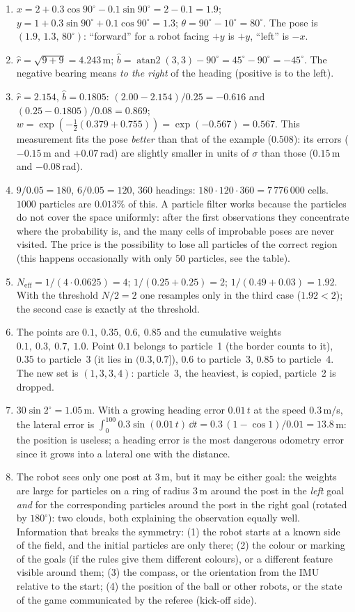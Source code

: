 \begin{enumerate}[label=\textbf{\ansnum.\arabic*}]
  \item $x=2+0.3\cos90^{\circ}-0.1\sin90^{\circ}=2-0.1=1.9$; $y=1+0.3\sin90^{\circ}+0.1\cos90^{\circ}=1.3$; $\theta=90^{\circ}-10^{\circ}=80^{\circ}$. The pose is $(1.9,\,1.3,\,80^{\circ})$: ``forward'' for a robot facing $+y$ is $+y$, ``left'' is $-x$.
  \item $\hat r=\sqrt{9+9}=4.243$\,m; $\hat b=\operatorname{atan2}(3,3)-90^{\circ}=45^{\circ}-90^{\circ}=-45^{\circ}$. The negative bearing means \emph{to the right} of the heading (positive is to the left).
  \item $\hat r=2.154$, $\hat b=0.1805$: $(2.00-2.154)/0.25=-0.616$ and $(0.25-0.1805)/0.08=0.869$; $w=\exp(-\tfrac12(0.379+0.755))=\exp(-0.567)=0.567$. This measurement fits the pose \emph{better} than that of the example ($0.508$): its errors ($-0.15$\,m and $+0.07$\,rad) are slightly smaller in units of $\sigma$ than those ($0.15$\,m and $-0.08$\,rad).
  \item $9/0.05=180$, $6/0.05=120$, $360$ headings: $180\cdot120\cdot360=7\,776\,000$ cells. $1000$ particles are $0.013\%$ of this. A particle filter works because the particles do not cover the space uniformly: after the first observations they concentrate where the probability is, and the many cells of improbable poses are never visited. The price is the possibility to lose all particles of the correct region (this happens occasionally with only $50$ particles, see the table).
  \item $N_{\text{eff}}=1/(4\cdot0.0625)=4$; $1/(0.25+0.25)=2$; $1/(0.49+0.03)=1.92$. With the threshold $N/2=2$ one resamples only in the third case ($1.92<2$); the second case is exactly at the threshold.
  \item The points are $0.1,\ 0.35,\ 0.6,\ 0.85$ and the cumulative weights $0.1,\ 0.3,\ 0.7,\ 1.0$. Point $0.1$ belongs to particle~1 (the border counts to it), $0.35$ to particle~3 (it lies in $(0.3,0.7]$), $0.6$ to particle~3, $0.85$ to particle~4. The new set is $(1,3,3,4)$: particle~3, the heaviest, is copied, particle~2 is dropped.
  \item $30\sin2^{\circ}=1.05$\,m. With a growing heading error $0.01\,t$ at the speed $0.3$\,m/s, the lateral error is $\int_0^{100}0.3\sin(0.01\,t)\,\dd t=0.3\,(1-\cos1)/0.01=13.8$\,m: the position is useless; a heading error is the most dangerous odometry error since it grows into a lateral one with the distance.
  \item The robot sees only one post at $3$\,m, but it may be either goal: the weights are large for particles on a ring of radius $3$\,m around the post in the \emph{left} goal \emph{and} for the corresponding particles around the post in the right goal (rotated by $180^{\circ}$): two clouds, both explaining the observation equally well. Information that breaks the symmetry: (1) the robot starts at a known side of the field, and the initial particles are only there; (2) the colour or marking of the goals (if the rules give them different colours), or a different feature visible around them; (3) the compass, or the orientation from the IMU relative to the start; (4) the position of the ball or other robots, or the state of the game communicated by the referee (kick-off side).

\end{enumerate}
